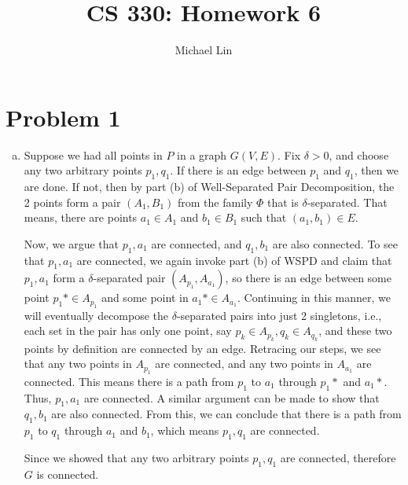 \documentclass{article}
\title{CS 330: Homework 6}
\author{Michael Lin}
\begin{document}
\maketitle
\section*{Problem 1}
\begin{enumerate}[(a)]
\item Suppose we had all points in $P$ in a graph $G(V,E)$. Fix $\delta>0$, and choose any two arbitrary points $p_1, q_1$. If there is an edge between $p_1$ and $q_1$, then we are done. If not, then by part (b) of Well-Separated Pair Decomposition, the 2 points form a pair $(A_1, B_1)$ from the family $\Phi$ that is $\delta$-separated. That means, there are points $a_1 \in A_1$ and $b_1 \in B_1$ such that $(a_1, b_1)\in E$.

Now, we argue that $p_1,a_1$ are connected, and $q_1, b_1$ are also connected. To see that $p_1,a_1$ are connected, we again invoke part (b) of WSPD and claim that $p_1, a_1$ form a $\delta$-separated pair $(A_{p_1}, A_{a_1})$, so there is an edge between some point $p_1* \in A_{p_1}$ and some point in $a_1* \in A_{a_1}$. Continuing in this manner, we will eventually decompose the $\delta$-separated pairs into just 2 singletons, i.e., each set in the pair has only one point, say $p_k \in A_{p_k}, q_k \in A_{q_k}$, and these two points by definition are connected by an edge. Retracing our steps, we see that any two points in $A_{p_1}$ are connected, and any two points in $A_{a_1}$ are connected. This means there is a path from $p_1$ to $a_1$ through $p_1*$ and $a_1*$. Thus, $p_1,a_1$ are connected. A similar argument can be made to show that $q_1, b_1$ are also connected. From this, we can conclude that there is a path from $p_1$ to $q_1$ through $a_1$ and $b_1$, which means $p_1, q_1$ are connected.

Since we showed that any two arbitrary points $p_1, q_1$ are connected, therefore $G$ is connected.


\end{enumerate}
\end{document}
